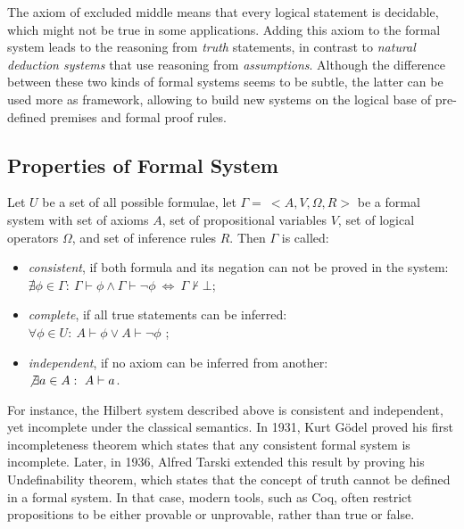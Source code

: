 \documentclass[article]{aaltoseries}
\begin{document}
The axiom of excluded middle means that every logical statement is decidable, which might not be true in some applications. Adding this axiom to the formal system leads to the reasoning from \textit{truth} statements, in contrast to \textit{natural deduction systems} that use reasoning from \textit{assumptions}. Although the difference between these two kinds of formal systems seems to be subtle, the latter can be used more as framework, allowing to build new systems on the logical base of pre-defined premises and formal proof rules. %

\subsection{Properties of Formal System}
\label{sec:properties}

Let $U$ be a set of all possible formulae, let $\Gamma = \ <A, V, \Omega, R>$ be a formal system with set of axioms $A$, set of propositional variables $V$, set of logical operators $\Omega$, and set of inference rules $R$. Then $\Gamma$ is called:
\begin{itemize}
	\itemsep0em
	\item \textit{consistent}, if both formula and its negation can not be proved in the system: \\
		$\nexists \phi \in \Gamma: \ \Gamma \vdash \phi \land \Gamma \vdash \neg \phi  \ \Leftrightarrow \ \Gamma \nvdash \bot$;
	\item \textit{complete}, if all true statements can be inferred: \\
		$\forall \phi \in U: \ A \vdash \phi \lor A \vdash \neg \phi$ ;
	\item \textit{independent}, if no axiom can be inferred from another: \\
		$\not \exists a \in A: \ A \vdash a$.
\end{itemize}

For instance, the Hilbert system described above is consistent and independent, yet incomplete under the classical semantics. In 1931, Kurt Gödel proved his first incompleteness theorem which states that any consistent formal system is incomplete. Later, in 1936, Alfred Tarski extended this result by proving his Undefinability theorem, which states that the concept of truth cannot be defined in a formal system. 
In that case, modern tools, such as Coq, often restrict propositions to be either provable or unprovable, rather than true or false.
\end{document}
